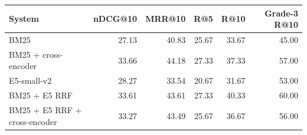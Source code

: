 \begin{tabular}{lrrrrr}
\toprule
System & nDCG@10 & MRR@10 & R@5 & R@10 & Grade-3 R@10 \\
\midrule
BM25 & 27.13 & 40.83 & 25.67 & 33.67 & 45.00 \\
BM25 + cross-encoder & 33.66 & 44.18 & 27.33 & 37.33 & 57.00 \\
E5-small-v2 & 28.27 & 33.54 & 20.67 & 31.67 & 53.00 \\
BM25 + E5 RRF & 33.61 & 43.61 & 27.33 & 40.33 & 60.00 \\
BM25 + E5 RRF + cross-encoder & 33.27 & 43.49 & 25.67 & 36.67 & 56.00 \\
\bottomrule
\end{tabular}
